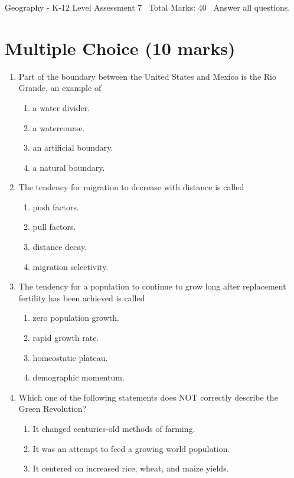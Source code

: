 \documentclass[12pt]{article}
\begin{document}
\begin{center}
Geography - K-12 Level Assessment 7 \
Total Marks: 40 \
Answer all questions.
\end{center}

\section*{Multiple Choice (10 marks)}
\begin{enumerate}[label=\arabic*.]
\item Part of the boundary between the United States and Mexico is the Rio Grande, an example of
\begin{enumerate}[label=(\alph*)]
    \item a water divider.
    \item a watercourse.
    \item an artificial boundary.
    \item a natural boundary.
\end{enumerate}
\item The tendency for migration to decrease with distance is called
\begin{enumerate}[label=(\alph*)]
    \item push factors.
    \item pull factors.
    \item distance decay.
    \item migration selectivity.
\end{enumerate}
\item The tendency for a population to continue to grow long after replacement fertility has been achieved is called
\begin{enumerate}[label=(\alph*)]
    \item zero population growth.
    \item rapid growth rate.
    \item homeostatic plateau.
    \item demographic momentum.
\end{enumerate}
\item Which one of the following statements does NOT correctly describe the Green Revolution?
\begin{enumerate}[label=(\alph*)]
    \item It changed centuries-old methods of farming.
    \item It was an attempt to feed a growing world population.
    \item It centered on increased rice, wheat, and maize yields.

\end{enumerate}
\end{enumerate}
\end{document}
